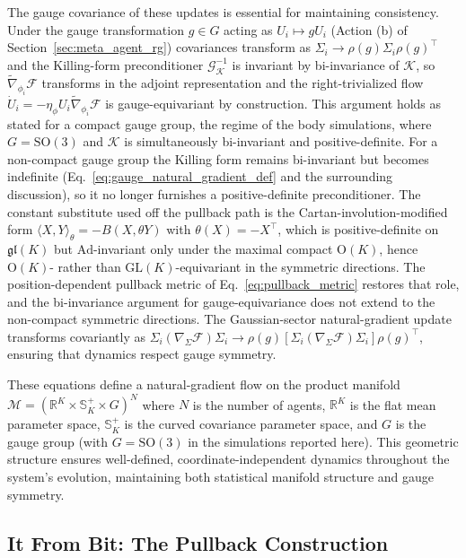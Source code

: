 \documentclass[11pt]{article}
\begin{document}
The gauge covariance of these updates is essential for maintaining consistency. Under the gauge transformation $g \in G$ acting as $U_i \mapsto g U_i$ (Action (b) of Section~\ref{sec:meta_agent_rg}) covariances transform as $\Sigma_i \to \rho(g) \Sigma_i \rho(g)^\top$ and the Killing-form preconditioner $\mathcal{G}_{\mathcal{K}}^{-1}$ is invariant by bi-invariance of $\mathcal{K}$, so $\tilde{\nabla}_{\phi_i}\mathcal{F}$ transforms in the adjoint representation and the right-trivialized flow $\dot U_i = -\eta_\phi U_i \tilde{\nabla}_{\phi_i}\mathcal{F}$ is gauge-equivariant by construction. This argument holds as stated for a compact gauge group, the regime of the body simulations, where $G = \mathrm{SO}(3)$ and $\mathcal{K}$ is simultaneously bi-invariant and positive-definite. For a non-compact gauge group the Killing form remains bi-invariant but becomes indefinite (Eq.~\eqref{eq:gauge_natural_gradient_def} and the surrounding discussion), so it no longer furnishes a positive-definite preconditioner. The constant substitute used off the pullback path is the Cartan-involution-modified form $\langle X, Y\rangle_\theta = -B(X, \theta Y)$ with $\theta(X) = -X^\top$, which is positive-definite on $\mathfrak{gl}(K)$ but $\mathrm{Ad}$-invariant only under the maximal compact $\mathrm{O}(K)$, hence $\mathrm{O}(K)$- rather than $\mathrm{GL}(K)$-equivariant in the symmetric directions. The position-dependent pullback metric of Eq.~\eqref{eq:pullback_metric} restores that role, and the bi-invariance argument for gauge-equivariance does not extend to the non-compact symmetric directions. The Gaussian-sector natural-gradient update transforms covariantly as $\Sigma_i (\nabla_\Sigma \mathcal{F}) \Sigma_i \to \rho(g)[\Sigma_i (\nabla_\Sigma \mathcal{F}) \Sigma_i]\rho(g)^\top$, ensuring that dynamics respect gauge symmetry.

These equations define a natural-gradient flow on the product manifold $\mathcal{M} = (\mathbb{R}^K \times \mathbb{S}^+_K \times G)^N$ where $N$ is the number of agents, $\mathbb{R}^K$ is the flat mean parameter space, $\mathbb{S}^+_K$ is the curved covariance parameter space, and $G$ is the gauge group (with $G = \mathrm{SO}(3)$ in the simulations reported here). This geometric structure ensures well-defined, coordinate-independent dynamics throughout the system's evolution, maintaining both statistical manifold structure and gauge symmetry.

\subsection{It From Bit: The Pullback Construction}
\label{sec:pullback}
\end{document}
